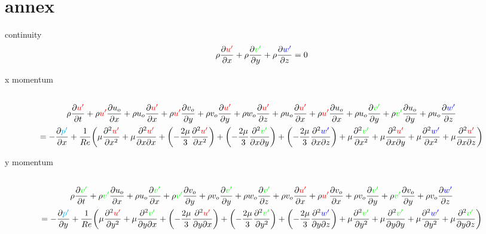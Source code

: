 \documentclass[ border=0pt, a4paper, 11pt]{article}
\numberwithin{equation}{section}
\renewcommand{\u}{\textcolor{red}{u'}}
\renewcommand{\v}{\textcolor{green}{v'}}
\newcommand{\w}{\textcolor{blue}{w'}}
\newcommand{\p}{\textcolor{cyan}{p'}}
\begin{document}
\section{annex}



continuity
\begin{equation}
 \rho\frac{\partial \u }{\partial x} + \rho\frac{\partial \v }{\partial y} + \rho\frac{\partial \w }{\partial z}  =0
\end{equation}

x momentum
\begin{multline}
\\\rho \frac{\partial \u }{\partial t} + \rho \u \frac{\partial u_o}{\partial x} + \rho u_o\frac{\partial \u }{\partial x} + \rho \u \frac{\partial v_o}{\partial y} + \rho v_o\frac{\partial \u }{\partial y} + \rho w_o\frac{\partial \u }{\partial z} + \rho u_o\frac{\partial \u }{\partial x} + \rho \u \frac{\partial u_o}{\partial x} + \rho u_o\frac{\partial \v }{\partial y} + \rho \v \frac{\partial u_o}{\partial y} + \rho u_o\frac{\partial \w }{\partial z}\\=-\frac{\partial \p }{\partial x} + \frac{1}{Re} \bigg(   \mu \frac{\partial^2 \u  }{\partial x^2} + \mu \frac{\partial^2 \u  }{\partial x \partial x } + \left(-\frac{2\mu }{3}\frac{\partial^2 \u }{\partial x^2}\right) + \left(-\frac{2\mu}{3}\frac{\partial^2 \v }{\partial x\partial y}\right) + \left(-\frac{2\mu}{3}\frac{\partial^2 \w }{\partial x\partial z}\right) + \mu \frac{\partial^2 \v  }{\partial x^2} + \mu \frac{\partial^2 \u  }{\partial x \partial y } + \mu \frac{\partial^2 \w  }{\partial x^2} + \mu \frac{\partial^2 \u  }{\partial x \partial z } \bigg)\\
\end{multline}

y momentum
\begin{multline}
\\\rho \frac{\partial \v }{\partial t}  + \rho \v \frac{\partial u_o}{\partial x} + \rho u_o\frac{\partial \v }{\partial x}  + \rho \v \frac{\partial v_o}{\partial y} + \rho v_o\frac{\partial \v }{\partial y}  + \rho w_o\frac{\partial \v }{\partial z} + \rho v_o\frac{\partial \u }{\partial x} + \rho \u \frac{\partial v_o}{\partial x} + \rho v_o\frac{\partial \v }{\partial y} + \rho \v \frac{\partial v_o}{\partial y} + \rho v_o\frac{\partial \w }{\partial z} \\=-\frac{\partial \p }{\partial y} + \frac{1}{Re}\bigg(  \mu\frac{\partial^2 \u }{\partial y^2} + \mu\frac{\partial^2 \v }{\partial y \partial x}  + \left(-\frac{2\mu}{3}\frac{\partial^2 \u }{\partial y\partial x}\right) + \left(-\frac{2\mu}{3}\frac{\partial^2 \v }{\partial y^2}\right) + \left(-\frac{2\mu}{3}\frac{\partial^2 \w }{\partial y\partial z}\right) + \mu\frac{\partial^2 \v }{\partial y^2} + \mu\frac{\partial^2 \v }{\partial y \partial y}  + \mu\frac{\partial^2 \w }{\partial y^2} + \mu\frac{\partial^2 \v }{\partial y \partial z} \bigg)\\
\end{multline}
\end{document}
